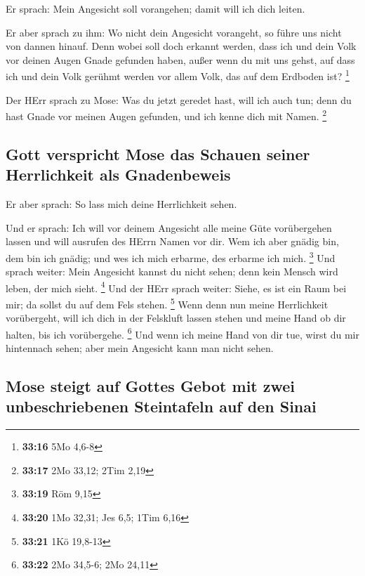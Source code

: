  Er sprach: Mein Angesicht soll vorangehen; damit will
ich dich leiten.

 Er aber sprach zu ihm: Wo nicht dein Angesicht
vorangeht, so führe uns nicht von dannen hinauf.  Denn
wobei soll doch erkannt werden, dass ich und dein Volk vor deinen Augen
Gnade gefunden haben, außer wenn du mit uns gehst, auf dass ich und dein
Volk gerühmt werden vor allem Volk, das auf dem Erdboden ist?
\footnote{\textbf{33:16} 5Mo 4,6-8}

 Der HErr sprach zu Mose: Was du jetzt geredet hast, will
ich auch tun; denn du hast Gnade vor meinen Augen gefunden, und ich
kenne dich mit Namen. \footnote{\textbf{33:17} 2Mo 33,12; 2Tim 2,19}

\hypertarget{gott-verspricht-mose-das-schauen-seiner-herrlichkeit-als-gnadenbeweis}{%
\subsection{Gott verspricht Mose das Schauen seiner Herrlichkeit als
Gnadenbeweis}\label{gott-verspricht-mose-das-schauen-seiner-herrlichkeit-als-gnadenbeweis}}

 Er aber sprach: So lass mich deine Herrlichkeit sehen.

 Und er sprach: Ich will vor deinem Angesicht alle meine
Güte vorübergehen lassen und will ausrufen des HErrn Namen vor dir. Wem
ich aber gnädig bin, dem bin ich gnädig; und wes ich mich erbarme, des
erbarme ich mich. \footnote{\textbf{33:19} Röm 9,15}  Und
sprach weiter: Mein Angesicht kannst du nicht sehen; denn kein Mensch
wird leben, der mich sieht. \footnote{\textbf{33:20} 1Mo 32,31; Jes 6,5;
  1Tim 6,16}  Und der HErr sprach weiter: Siehe, es ist
ein Raum bei mir; da sollst du auf dem Fels stehen. \footnote{\textbf{33:21}
  1Kö 19,8-13}  Wenn denn nun meine Herrlichkeit
vorübergeht, will ich dich in der Felskluft lassen stehen und meine Hand
ob dir halten, bis ich vorübergehe. \footnote{\textbf{33:22} 2Mo 34,5-6;
  2Mo 24,11}  Und wenn ich meine Hand von dir tue, wirst
du mir hintennach sehen; aber mein Angesicht kann man nicht sehen.

\hypertarget{mose-steigt-auf-gottes-gebot-mit-zwei-unbeschriebenen-steintafeln-auf-den-sinai}{%
\subsection{Mose steigt auf Gottes Gebot mit zwei unbeschriebenen
Steintafeln auf den
Sinai}\label{mose-steigt-auf-gottes-gebot-mit-zwei-unbeschriebenen-steintafeln-auf-den-sinai}}

